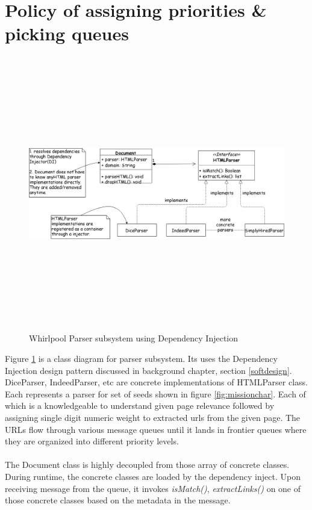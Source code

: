 \section{Policy of assigning priorities \& picking queues}
\begin{figure}[h!]
  \centering
  \includegraphics[width=15cm,height=12cm,keepaspectratio]{../media/crawler/docparsers.png}
  \caption{Whirlpool Parser subsystem using Dependency Injection}
  \label{fig:htmlparser}
\end{figure}

\noindent
Figure \ref{fig:htmlparser} is a class diagram for parser subsystem. Its uses the Dependency Injection
design pattern discussed in background chapter, section \ref{softdesign}. DiceParser, IndeedParser, etc are
concrete implementations of HTMLParser class. Each represents a parser for set of seeds shown in figure
\ref{fig:missionchar}. Each of which is a knowledgeable to understand given page relevance followed by assigning single digit numeric weight to extracted urls from the given page. The URLs flow through various message queues until it lands in frontier queues where they are organized into different priority levels. 
\\
\\
\noindent
The Document class is highly decoupled from those array of concrete classes. During runtime, the
concrete classes are loaded by the dependency inject. Upon receiving message from the queue, it invokes
\textit{isMatch()}, \textit{extractLinks()} on one of those concrete classes based on the metadata in the
message.

\pagebreak



